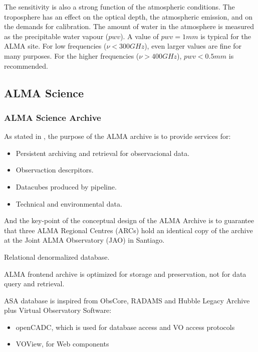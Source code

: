 The sensitivity is also a strong function of the atmospheric conditions. The troposphere has an effect on the optical depth, the atmospheric emission, and on the demands for calibration. The amount of water in the atmosphere is measured as the precipitable water vapour ($pwv$). A value of $pwv=1 mm$ is typical for the ALMA site. For low frequencies ($\nu<300 GHz$), even larger values are fine for many purposes. For the higher frequencies ($\nu>400 GHz$), $pwv<0.5 mm$ is recommended.


\subsection{ALMA Science}

\subsubsection{ALMA Science Archive}

As stated in \cite{Etoka12}, the purpose of the ALMA archive is to provide services for:

\begin{itemize}
\item Persistent archiving and retrieval for observacional data.
\item Observaction descrpitors.
\item Datacubes produced by pipeline.
\item Technical and environmental data.
\end{itemize}

And the key-point of the conceptual design of the ALMA Archive is to guarantee that three ALMA Regional Centres (ARCs) hold an identical copy of the archive at the Joint ALMA Observatory (JAO) in Santiago. 

Relational denormalized database.

ALMA frontend archive is optimized for storage and preservation, not for data query and retrieval.

ASA database is inspired from ObsCore, RADAMS and Hubble Legacy Archive plus Virtual Observatory Software:

\begin{itemize}

\item openCADC, which is used for database access and VO access protocols
\item VOView, for Web components

\end{itemize}


